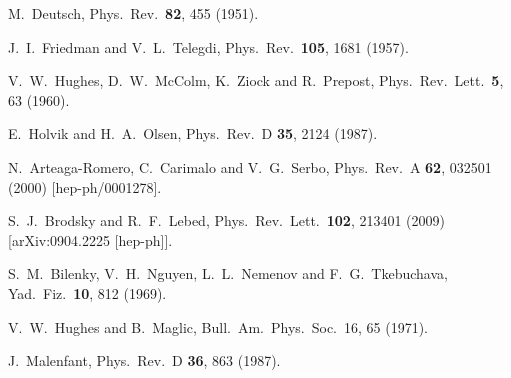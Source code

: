 

  M.~Deutsch,
  Phys.\ Rev.\  {\bf 82}, 455 (1951).

 
  J.~I.~Friedman and V.~L.~Telegdi,
  Phys.\ Rev.\  {\bf 105}, 1681 (1957).


  V.~W.~Hughes, D.~W.~McColm, K.~Ziock and R.~Prepost,
  Phys.\ Rev.\ Lett.\  {\bf 5}, 63 (1960).



  E.~Holvik and H.~A.~Olsen,
  Phys.\ Rev.\ D {\bf 35}, 2124 (1987).


  N.~Arteaga-Romero, C.~Carimalo and V.~G.~Serbo,
  Phys.\ Rev.\ A {\bf 62}, 032501 (2000)
  [hep-ph/0001278].


  S.~J.~Brodsky and R.~F.~Lebed,
  Phys.\ Rev.\ Lett.\  {\bf 102}, 213401 (2009)
  [arXiv:0904.2225 [hep-ph]].

  S.~M.~Bilenky, V.~H.~Nguyen, L.~L.~Nemenov and F.~G.~Tkebuchava,
  Yad.\ Fiz.\  {\bf 10}, 812 (1969). 


  V.~W.~Hughes and B.~Maglic, 
  Bull.\ Am.\ Phys.\ Soc.\ 16, 65 (1971). 


  J.~Malenfant,
  Phys.\ Rev.\ D {\bf 36}, 863 (1987).


